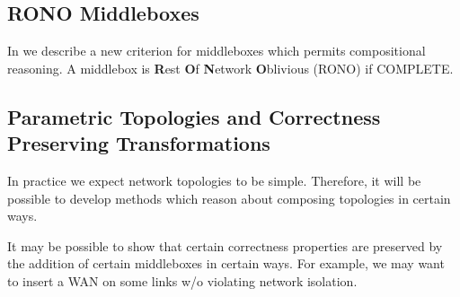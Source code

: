 \subsection{RONO Middleboxes}
In \cite{CCR:PLASS15} we describe a new criterion for middleboxes which permits compositional reasoning.
A middlebox is \textbf{R}\/est \textbf{O}\/f \textbf{N}etwork \textbf{O}\/blivious (RONO) if COMPLETE.


\subsection{Parametric Topologies and Correctness Preserving Transformations}
In practice we expect network topologies to be simple.
Therefore, it will be possible to develop methods which reason about composing topologies in certain ways.

It may be possible to show that certain correctness properties are preserved by the addition of certain middleboxes in certain ways.
For example, we may want to insert a WAN on some links w/o violating network isolation.
